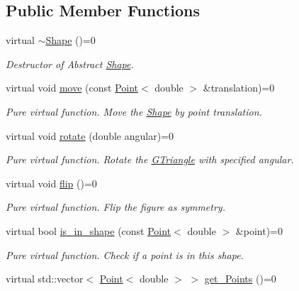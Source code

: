 \subsection*{Public Member Functions}
\begin{DoxyCompactItemize}
\item 
\mbox{\label{classShape_a39fe45638d872f0ce9670d7f85290161}} 
virtual \hyperlink{classShape_a39fe45638d872f0ce9670d7f85290161}{$\sim$\+Shape} ()=0
\begin{DoxyCompactList}\small\item\em Destructor of Abstract \hyperlink{classShape}{Shape}. \end{DoxyCompactList}\item 
virtual void \hyperlink{classShape_a1f447acd6219cb10b9b7a40371519c46}{move} (const \hyperlink{classPoint}{Point}$<$ double $>$ \&translation)=0
\begin{DoxyCompactList}\small\item\em Pure virtual function. Move the \hyperlink{classShape}{Shape} by point translation. \end{DoxyCompactList}\item 
virtual void \hyperlink{classShape_a2dea8616fd40f2d69fd208715921982a}{rotate} (double angular)=0
\begin{DoxyCompactList}\small\item\em Pure virtual function. Rotate the \hyperlink{classGTriangle}{G\+Triangle} with specified angular. \end{DoxyCompactList}\item 
\mbox{\label{classShape_a5a1607f7dc4908225f97aeadb449636d}} 
virtual void \hyperlink{classShape_a5a1607f7dc4908225f97aeadb449636d}{flip} ()=0
\begin{DoxyCompactList}\small\item\em Pure virtual function. Flip the figure as symmetry. \end{DoxyCompactList}\item 
virtual bool \hyperlink{classShape_aa09a621da090e42840b4bec7ffb27620}{is\+\_\+in\+\_\+shape} (const \hyperlink{classPoint}{Point}$<$ double $>$ \&point)=0
\begin{DoxyCompactList}\small\item\em Pure virtual function. Check if a point is in this shape. \end{DoxyCompactList}\item 
virtual std\+::vector$<$ \hyperlink{classPoint}{Point}$<$ double $>$ $>$ \hyperlink{classShape_add74a5c682840fa4a519242b1ddbd0b5}{get\+\_\+\+Points} ()=0

\end{DoxyCompactItemize}
